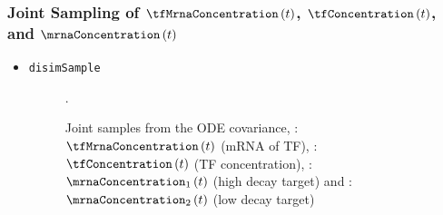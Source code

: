 \begin{frame}
  \frametitle{Joint Sampling of $\tfMrnaConcentration\left(t\right)$, $\tfConcentration\left(t\right)$, and $\mrnaConcentration\left(t\right)$ }
  \begin{itemize}
  \item {\texttt{disimSample}}%
    \begin{figure}

      \caption{ {\small Joint samples from the ODE covariance,
          \textcolor{\blueColor}{\emph{\blueColor}: $\tfMrnaConcentration\left(t\right)$ (mRNA of TF)},
          \textcolor{\blackColor}{\emph{\blackColor}: $\tfConcentration\left(t\right)$ (TF concentration)},
          \textcolor{\redColor}{\emph{\redColor}: $\mrnaConcentration_{1}\left(t\right)$ (high
            decay target)} and \textcolor{\greenColor}{\emph{\greenColor}:
            $\mrnaConcentration_{2}\left(t\right)$ (low decay target)}}}.
      
    \end{figure}
    
  \end{itemize}
  
\end{frame}
